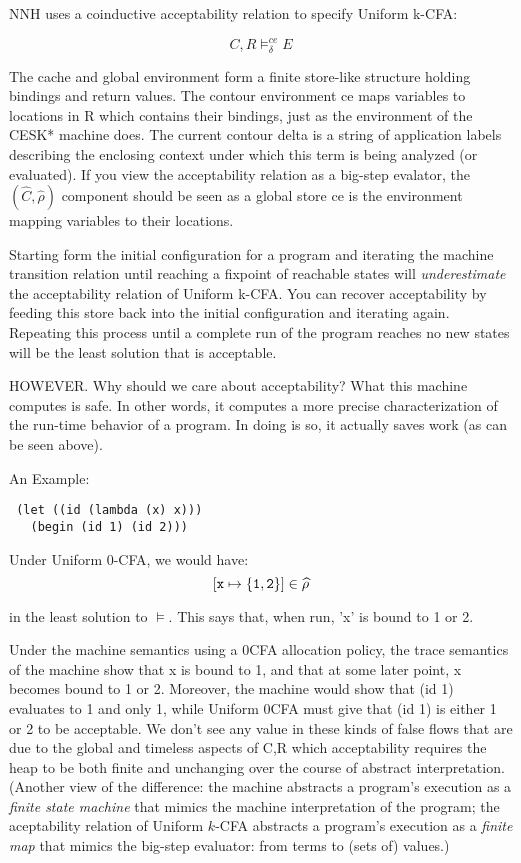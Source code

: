 \documentclass[preprint]{sigplanconf}
\begin{document}
NNH uses a coinductive acceptability relation to specify Uniform
k-CFA:

\[
   C,R \models^{ce}_\delta E
\]

The cache and global environment form a finite store-like structure
holding bindings and return values.  The contour environment ce maps
variables to locations in R which contains their bindings, just as the
environment of the CESK* machine does.  The current contour delta is a
string of application labels describing the enclosing context under
which this term is being analyzed (or evaluated).  If you view the
acceptability relation as a big-step evalator, the
$(\widehat C,\widehat\rho)$ component should be seen as a global
store ce is the environment mapping variables to their locations.

Starting form the initial configuration for a program and iterating
the machine transition relation until reaching a fixpoint of reachable
states will \emph{underestimate} the acceptability relation of Uniform
k-CFA.  You can recover acceptability by feeding this store back into
the initial configuration and iterating again.  Repeating this process
until a complete run of the program reaches no new states will be the
least solution that is acceptable.

HOWEVER.  Why should we care about acceptability?  What this
machine computes is safe.  In other words, it computes a more
precise characterization of the run-time behavior of a program.  In
doing is so, it actually saves work (as can be seen above).

An Example:

\begin{verbatim}
 (let ((id (lambda (x) x)))
   (begin (id 1) (id 2)))
\end{verbatim}

Under Uniform 0-CFA, we would have:
\[
   [{\tt x} \mapsto \{{\tt 1}, {\tt 2}\}] \in \widehat\rho
\]

in the least solution to $\models$.  This says that, when run, 'x' is
bound to 1 or 2.

Under the machine semantics using a 0CFA allocation policy, the trace
semantics of the machine show that x is bound to 1, and that at some
later point, x becomes bound to 1 or 2.  Moreover, the machine would
show that (id 1) evaluates to 1 and only 1, while Uniform 0CFA must
give that (id 1) is either 1 or 2 to be acceptable.  We don't see any
value in these kinds of false flows that are due to the global and
timeless aspects of C,R which acceptability requires the heap to be
both finite and unchanging over the course of abstract
interpretation. (Another view of the difference: the machine abstracts
a program's execution as a \emph{finite state machine} that mimics the
machine interpretation of the program; the aceptability relation of
Uniform \(k\)-CFA abstracts a program's execution as a \emph{finite
  map} that mimics the big-step evaluator: from terms to (sets of)
values.)
\end{document}
